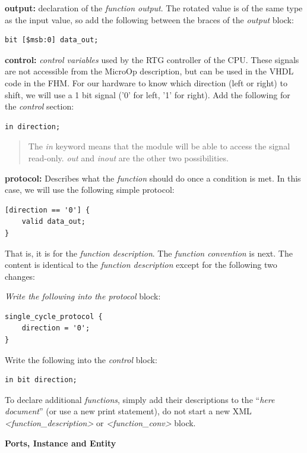 \textbf{output:} declaration of the \emph{function output}. The rotated
value is of the same type as the input value, so add the following
between the braces of the \emph{output} block:
\begin{lstlisting}
bit [$msb:0] data_out;
\end{lstlisting}
\textbf{control:} \emph{control variables} used by the RTG controller of
the CPU. These signals are not accessible from the MicroOp description,
but can be used in the VHDL code in the FHM. For our hardware to know
which direction (left or right) to shift, we will use a 1 bit signal
('0' for left, '1' for right). Add the following for the \emph{control}
section:
\begin{lstlisting}
in direction;
\end{lstlisting}
\begin{quote}
The \emph{in} keyword means that the module will be able to access the
signal read-only. \emph{out} and \emph{inout} are the other two
possibilities.
\end{quote}

\textbf{protocol:} Describes what the \emph{function} should do once a
condition is met. In this case, we will use the following simple
protocol:
\begin{lstlisting}
[direction == '0'] {
	valid data_out;
}
\end{lstlisting}
That is, it is for the \emph{function description}. The \emph{function
convention} is next. The content is identical to the \emph{function
description} except for the following two changes:

\emph{Write the following into the protocol} block:
\begin{lstlisting}
single_cycle_protocol {
	direction = '0';
}
\end{lstlisting}
Write the following into the \emph{control} block:
\begin{lstlisting}
in bit direction;
\end{lstlisting}
To declare additional \emph{functions}, simply add their descriptions to
the ``\emph{here document}'' (or use a new print statement), do not
start a new XML \emph{\textless function\_description\textgreater{}} or
\emph{\textless function\_conv\textgreater{}} block.

\textbf{Ports, Instance and Entity}

